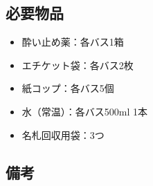 \newpage

\subsection{必要物品}
\begin{itemize}
\item 酔い止め薬：各バス1箱
\item エチケット袋：各バス2枚
\item 紙コップ：各バス5個
\item 水（常温）：各バス500ml 1本
\item 名札回収用袋：3つ
\end{itemize}


\subsection{備考}


%
